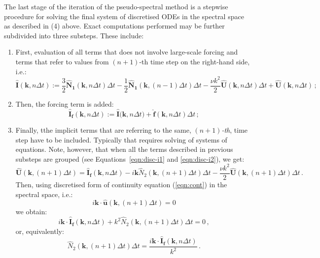 \documentclass{pracamgren}
\begin{document}
The last stage of the iteration of the pseudo-spectral method is a stepwise procedure for solving the final system of discretised ODEs in the spectral space as described in (4) above.
Exact computations performed may be further subdivided into three substeps.
These include:
\begin{enumerate}
\item First, evaluation of all terms that does not involve large-scale forcing and terms that refer to values from $(n+1)$-th time step on the right-hand side, i.e.:
\begin{equation}
\label{eqn:disc-i1}
\mathbf{\hat{I}}(\mathbf{k}, n \Delta t) := \frac{3}{2} \mathbf{\hat{N}_1}(\mathbf{k}, n \Delta t) \Delta t - \frac{1}{2} \mathbf{\hat{N}_1}(\mathbf{k}, (n-1) \Delta t) \Delta t - \frac{\nu k^2}{2} \mathbf{\hat{U}}(\mathbf{k}, n \Delta t) \Delta t + \mathbf{\hat{U}}(\mathbf{k}, n \Delta t) \, ;
\end{equation}
\item Then, the forcing term is added:
\begin{equation}
\label{eqn:disc-i2}
\mathbf{\hat{I}_f}(\mathbf{k}, n \Delta t) := \mathbf{\hat{I}(\mathbf{k}}, n \Delta t) + \mathbf{\hat{f}}(\mathbf{k}, n \Delta t) \Delta t \, ;
\end{equation}
\item Finally, tthe implicit terms that are referring to the same, $(n+1)$\emph{-th}, time step have to be included.
Typically that requires solving of systems of equations.
Note, however, that when all the terms described in previous substeps are grouped (see Equations~\ref{eqn:disc-i1} and \ref{eqn:disc-i2}), we get:
\begin{equation}
\label{eqn:disc-i2rem}
\mathbf{\hat{U}}(\mathbf{k}, (n+1) \Delta t) = \mathbf{\hat{I}_f}(\mathbf{k}, n \Delta t) - i \mathbf{k} \hat{N}_2 (\mathbf{k}, (n+1) \Delta t) \Delta t - \frac{\nu k^2}{2} \mathbf{\hat{U}}(\mathbf{k}, (n+1) \Delta t) \Delta t \, .
\end{equation}
Then, using discretised form of continuity equation (\ref{eqn:cont}) in the spectral space, i.e.:
$$ i \mathbf{k} \cdot \mathbf{\hat{u}}(\mathbf{k}, (n+1) \Delta t) = 0 $$
we obtain:
$$ i \mathbf{k} \cdot \mathbf{\hat{I}_f}(\mathbf{k}, n \Delta t) + k^2 \hat{N}_2 (\mathbf{k}, (n+1) \Delta t) \Delta t = 0 \, , $$
or, equivalently:
\begin{equation}
\label{eqn:disc-n2}
\hat{N}_2 (\mathbf{k}, (n+1) \Delta t) \Delta t = \frac{i \mathbf{k} \cdot \mathbf{\hat{I}_f}(\mathbf{k}, n \Delta t)}{k^2} \, .
\end{equation}

\end{enumerate}
\end{document}
